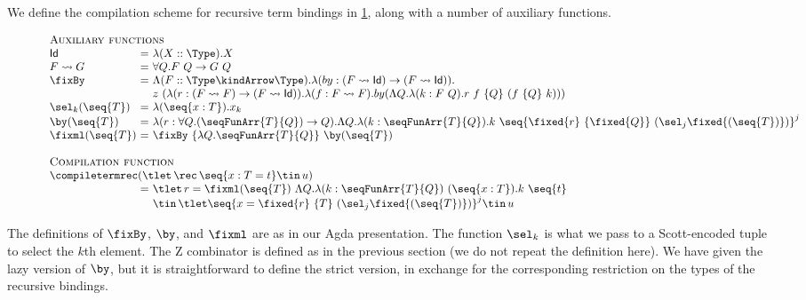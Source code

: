 \newcommand{\selnk}[2]{\sel_{#2}^{#1}}
\newcommand{\selk}[1]{\sel_{#1}}

We define the compilation scheme for recursive term bindings in
\cref{fig:compile-recursive-terms}, along with a number of auxiliary
functions.

\newcommand{\natT}[2]{#1 \rightsquigarrow #2}

\begin{figure}[!t]
  \centering
  \begin{displaymath}
  \begin{array}{l@{\ }l@{\ }l}
  \multicolumn{3}{l}{\textsc{Auxiliary functions}}\\
  \textsf{Id} &=& \lambda (X :: \Type) . X \\
  \natT{F}{G} &=& \forall Q . F\ Q \rightarrow G\ Q\\
  \fixBy &=& \Lambda (F :: \Type \kindArrow \Type) . 
  \lambda (by : (\natT{F}{\textsf{Id}}) \rightarrow (\natT{F}{\textsf{Id}})) . \\
  &&z\ (\lambda (r : (\natT{F}{F}) \rightarrow (\natT{F}{\textsf{Id}})) . 
  \lambda (f : \natT{F}{F}) . 
  by (
  \Lambda Q . 
  \lambda (k : F\ Q) . 
  r\ f\ \{ Q \}\ (f\ \{ Q \}\ k)))\\
  \selk{k}(\seq{T}) &=& \lambda (\seq{x:T}) . x_k\\
  \by(\seq{T}) &=& \lambda (r : \forall Q . (\seqFunArr{T}{Q}) \rightarrow Q) . \Lambda Q. 
  \lambda (k : \seqFunArr{T}{Q}).
  k\ \seq{\fixed{r}\ \{ \fixed{Q} \}\ (\selk{j} \fixed{(\seq{T})})}^j\\
  \fixml(\seq{T}) &=& \fixBy\ \{ \lambda Q . \seqFunArr{T}{Q} \}\ \by(\seq{T})\\
  \\
  \multicolumn{3}{l}{\textsc{Compilation function}}\\
  \multicolumn{3}{l}{\compiletermrec(\tlet\, \rec\, \seq{x : T = t} \tin\, u)}\\
  &=&\tlet\, r = \fixml(\seq{T})\ \Lambda Q . \lambda (k: \seqFunArr{T}{Q} )\ (\seq{x:T}) . k\ \seq{t} \\
  &&\tin\, \tlet \seq{x = \fixed{r}\ \{ T \}\ (\selk{j} \fixed{(\seq{T})})}^j \tin\, u
  \end{array}
  \end{displaymath}

  \label{fig:compile-recursive-terms}
\end{figure}

\noindent The definitions of $\fixBy$, $\by$, and $\fixml$ are as in our
Agda presentation. The function $\selk{k}$ is what we pass to a Scott-encoded
tuple to select the $k$th element. The Z combinator is defined as in the
previous section (we do not repeat the definition here). We have given the lazy version of $\by$, but it is
straightforward to define the strict version, in exchange for the corresponding
restriction on the types of the recursive bindings.

